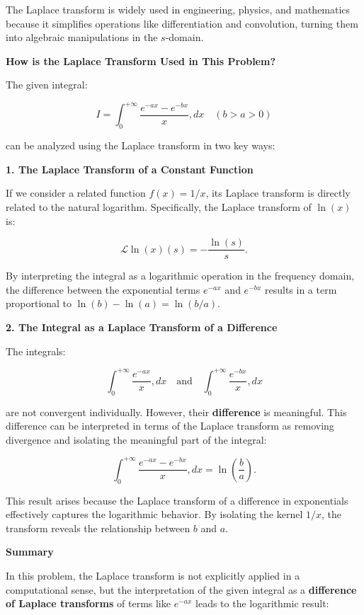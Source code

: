 \documentclass[a4paper,12pt]{book}
\begin{document}
The Laplace transform is widely used in engineering, physics, and mathematics because it simplifies operations like differentiation and convolution, turning them into algebraic manipulations in the \( s \)-domain.

\hrulefill

\textbf{How is the Laplace Transform Used in This Problem?}

The given integral:

\[
I = \int_0^{+\infty} \frac{e^{-ax} - e^{-bx}}{x} , dx \quad (b > a > 0)
\]

can be analyzed using the Laplace transform in two key ways:

\hrulefill

\textbf{1. The Laplace Transform of a Constant Function}

If we consider a related function \( f(x) = 1/x \), its Laplace transform is directly related to the natural logarithm. Specifically, the Laplace transform of \( \ln(x) \) is:

\[
\mathcal{L}{\ln(x)}(s) = -\frac{\ln(s)}{s}.
\]

By interpreting the integral as a logarithmic operation in the frequency domain, the difference between the exponential terms \( e^{-ax} \) and \( e^{-bx} \) results in a term proportional to \( \ln(b) - \ln(a) = \ln(b/a) \).

\hrulefill

\textbf{2. The Integral as a Laplace Transform of a Difference}

The integrals:

\[
\int_0^{+\infty} \frac{e^{-ax}}{x} , dx \quad \text{and} \quad \int_0^{+\infty} \frac{e^{-bx}}{x} , dx
\]

are not convergent individually. However, their \textbf{difference} is meaningful. This difference can be interpreted in terms of the Laplace transform as removing divergence and isolating the meaningful part of the integral:

\[
\int_0^{+\infty} \frac{e^{-ax} - e^{-bx}}{x} , dx = \ln\left(\frac{b}{a}\right).
\]

This result arises because the Laplace transform of a difference in exponentials effectively captures the logarithmic behavior. By isolating the kernel \( 1/x \), the transform reveals the relationship between \( b \) and \( a \).

\hrulefill

\textbf{Summary}

In this problem, the Laplace transform is not explicitly applied in a computational sense, but the interpretation of the given integral as a \textbf{difference of Laplace transforms} of terms like \( e^{-ax} \) leads to the logarithmic result:
\end{document}

